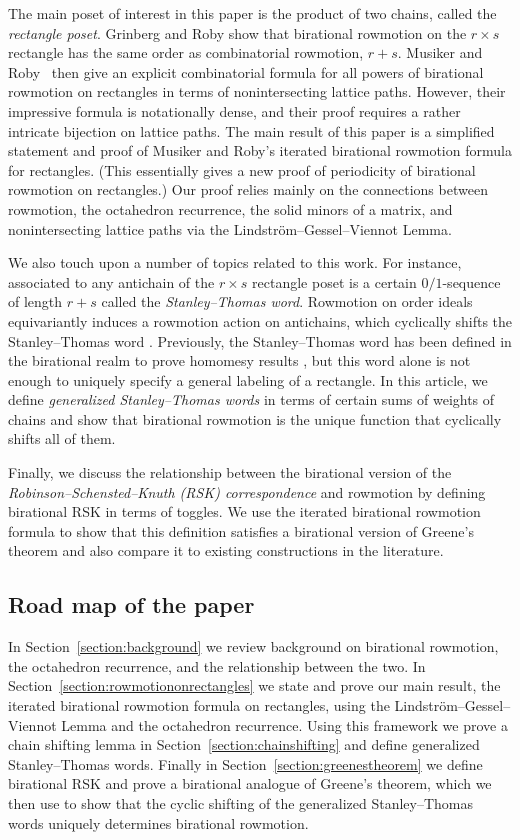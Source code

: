 \documentclass[ALCO,Unicode,published]{cedram}
\numberwithin{equation}{section}
\begin{document}
The main poset of interest in this paper is the product of two chains, called the \emph{rectangle poset}. Grinberg and Roby \cite{grinbergroby2} show that birational rowmotion on the $r \times s$ rectangle has the same order as combinatorial rowmotion, $r+s$.  Musiker and Roby~\cite{musikerroby} then give an explicit combinatorial formula for all powers of birational rowmotion on rectangles in terms of nonintersecting lattice paths. However, their impressive formula is notationally dense, and their proof requires a rather intricate bijection on lattice paths. The main result of this paper is a simplified statement and proof of Musiker and Roby's iterated birational rowmotion formula for rectangles. (This essentially gives a new proof of periodicity of birational rowmotion on rectangles.) Our proof relies mainly on the connections between rowmotion, the octahedron recurrence, the solid minors of a matrix, and nonintersecting lattice paths via the Lindstr\"om--Gessel--Viennot Lemma.

We also touch upon a number of topics related to this work. For instance, associated to any antichain of the $r \times s$ rectangle poset is a certain $0/1$-sequence of length $r+s$ called the \emph{Stanley--Thomas word}. Rowmotion on order ideals equivariantly induces a rowmotion action on antichains, which cyclically shifts the Stanley--Thomas word \cite{propproby,stanley1}. Previously, the Stanley--Thomas word has been defined in the birational realm to prove homomesy results \cite{josephroby1}, but this word alone is not enough to uniquely specify a general labeling of a rectangle. In this article, we define \emph{generalized Stanley--Thomas words} in terms of certain sums of weights of chains and show that birational rowmotion is the unique function that cyclically shifts all of them. 

Finally, we discuss the relationship between the birational version of the \emph{Robinson--Schensted--Knuth (RSK) correspondence} \cite{danilovkoshevoy, noumiyamada} and rowmotion by defining birational RSK in terms of toggles. We use the iterated birational rowmotion formula to show that this definition satisfies a birational version of Greene's theorem and also compare it to existing constructions in the literature.

\subsection*{Road map of the paper} In Section~\ref{section:background} we review background on birational rowmotion, the octahedron recurrence, and the relationship between the two. In Section~\ref{section:rowmotiononrectangles} we state and prove our main result, the iterated birational rowmotion formula on rectangles, using the Lindstr\"om--Gessel--Viennot Lemma and the octahedron recurrence. Using this framework we prove a chain shifting lemma in Section~\ref{section:chainshifting} and define generalized Stanley--Thomas words. Finally in Section~\ref{section:greenestheorem} we define birational RSK and prove a birational analogue of Greene's theorem, which we then use to show that the cyclic shifting of the generalized Stanley--Thomas words uniquely determines birational rowmotion.
\end{document}
